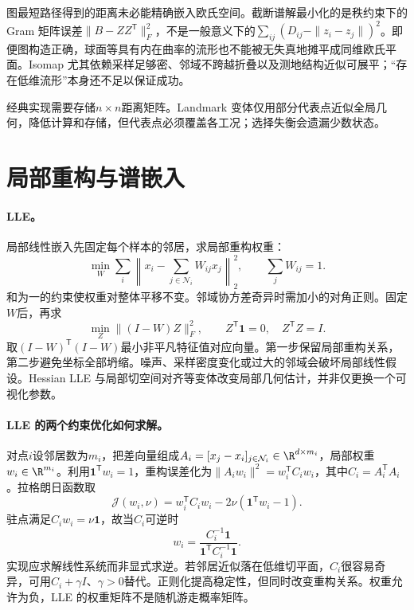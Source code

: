 图最短路径得到的距离未必能精确嵌入欧氏空间。截断谱解最小化的是秩约束下的 Gram 矩阵误差$\|B-ZZ^{\mathsf T}\|_F^2$，不是一般意义下的$\sum_{ij}(D_{ij}-\|z_i-z_j\|)^2$。即便图构造正确，球面等具有内在曲率的流形也不能被无失真地摊平成同维欧氏平面。Isomap 尤其依赖采样足够密、邻域不跨越折叠以及测地结构近似可展平；“存在低维流形”本身还不足以保证成功。

经典实现需要存储$n\times n$距离矩阵。Landmark 变体仅用部分代表点近似全局几何，降低计算和存储，但代表点必须覆盖各工况；选择失衡会遗漏少数状态。

\section{局部重构与谱嵌入}
\paragraph{LLE。}
局部线性嵌入先固定每个样本的邻居，求局部重构权重\cite{roweis2000lle}：
\begin{equation}
 \min_W\sum_i\left\|x_i-\sum_{j\in\mathcal N_i}W_{ij}x_j\right\|_2^2,
 \qquad \sum_jW_{ij}=1.
\end{equation}
和为一的约束使权重对整体平移不变。邻域协方差奇异时需加小的对角正则。固定$W$后，再求
\begin{equation}
 \min_Z\|(I-W)Z\|_F^2,\qquad
 Z^{\mathsf T}\mathbf1=0,\quad Z^{\mathsf T}Z=I.
\end{equation}
取$(I-W)^{\mathsf T}(I-W)$最小非平凡特征值对应向量。第一步保留局部重构关系，第二步避免坐标全部坍缩。噪声、采样密度变化或过大的邻域会破坏局部线性假设。Hessian LLE 与局部切空间对齐等变体改变局部几何估计，并非仅更换一个可视化参数\cite{donoho2003hessian,zhang2004ltsa}。

\paragraph{LLE 的两个约束优化如何求解。}
对点$i$设邻居数为$m_i$，把差向量组成$A_i=[x_j-x_i]_{j\in\mathcal N_i}\in\R^{d\times m_i}$，局部权重$w_i\in\R^{m_i}$。利用$\mathbf1^{\mathsf T}w_i=1$，重构误差化为$\|A_iw_i\|^2=w_i^{\mathsf T}C_iw_i$，其中$C_i=A_i^{\mathsf T}A_i$。拉格朗日函数取
\begin{equation}
 \mathcal J(w_i,\nu)=w_i^{\mathsf T}C_iw_i
 -2\nu(\mathbf1^{\mathsf T}w_i-1).
\end{equation}
驻点满足$C_iw_i=\nu\mathbf1$，故当$C_i$可逆时
\begin{equation}
 w_i=\frac{C_i^{-1}\mathbf1}{\mathbf1^{\mathsf T}C_i^{-1}\mathbf1}.
\end{equation}
实现应求解线性系统而非显式求逆。若邻居近似落在低维切平面，$C_i$很容易奇异，可用$C_i+\gamma I$、$\gamma>0$替代。正则化提高稳定性，但同时改变重构关系。权重允许为负，LLE 的权重矩阵不是随机游走概率矩阵。

